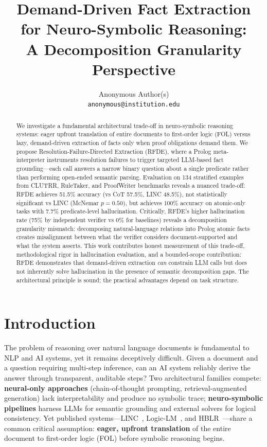 \documentclass[11pt,letterpaper]{article}
\title{\textbf{Demand-Driven Fact Extraction for Neuro-Symbolic Reasoning:\\A Decomposition Granularity Perspective}}
\author{
Anonymous Author(s)\\
\texttt{anonymous@institution.edu}
}
\date{}
\begin{document}
\maketitle

\begin{abstract}
We investigate a fundamental architectural trade-off in neuro-symbolic reasoning systems: eager upfront translation of entire documents to first-order logic (FOL) versus lazy, demand-driven extraction of facts only when proof obligations demand them. We propose Resolution-Failure-Directed Extraction (RFDE), where a Prolog meta-interpreter instruments resolution failures to trigger targeted LLM-based fact grounding---each call answers a narrow binary question about a single predicate rather than performing open-ended semantic parsing. Evaluation on 134 stratified examples from CLUTRR, RuleTaker, and ProofWriter benchmarks reveals a nuanced trade-off: RFDE achieves 51.5\% accuracy (vs CoT 57.5\%, LINC 48.5\%), not statistically significant vs LINC (McNemar $p=0.50$), but achieves 100\% accuracy on atomic-only tasks with 7.7\% predicate-level hallucination. Critically, RFDE's higher hallucination rate (75\% by independent verifier vs 0\% for baselines) reveals a decomposition granularity mismatch: decomposing natural-language relations into Prolog atomic facts creates misalignment between what the verifier considers document-supported and what the system asserts. This work contributes honest measurement of this trade-off, methodological rigor in hallucination evaluation, and a bounded-scope contribution: RFDE demonstrates that demand-driven extraction \emph{can} constrain LLM calls but does not inherently solve hallucination in the presence of semantic decomposition gaps. The architectural principle is sound; the practical advantages depend on task structure.
\end{abstract}

\section{Introduction}

The problem of reasoning over natural language documents is fundamental to NLP and AI systems, yet it remains deceptively difficult. Given a document and a question requiring multi-step inference, can an AI system reliably derive the answer through transparent, auditable steps? Two architectural families compete: \textbf{neural-only approaches} (chain-of-thought prompting, retrieval-augmented generation) lack interpretability and produce no symbolic trace; \textbf{neuro-symbolic pipelines} harness LLMs for semantic grounding and external solvers for logical consistency. Yet published systems---LINC~\citep{Olausson2023}, Logic-LM~\citep{Pan2023}, and HBLR~\citep{Li2025}---share a common critical assumption: \textbf{eager, upfront translation} of the entire document to first-order logic (FOL) before symbolic reasoning begins.
\end{document}
